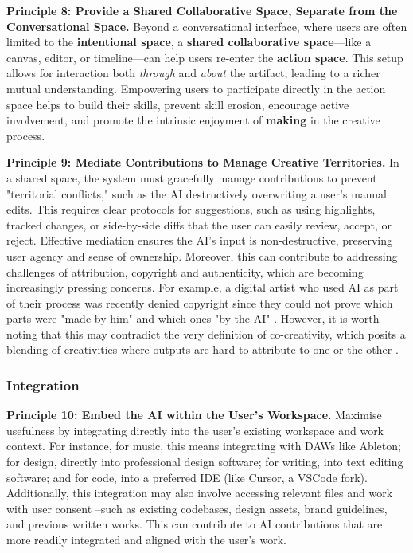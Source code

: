 \textbf{Principle 8: Provide a Shared Collaborative Space, Separate from the Conversational Space.} Beyond a conversational interface, where users are often limited to the \textbf{intentional space}, a \textbf{shared collaborative space}—like a canvas, editor, or timeline—can help users re-enter the \textbf{action space}. This setup allows for interaction both \textit{through} and \textit{about} the artifact, leading to a richer mutual understanding. Empowering users to participate directly in the action space helps to build their skills, prevent skill erosion, encourage active involvement, and promote the intrinsic enjoyment of \textbf{making} in the creative process. 

\textbf{Principle 9: Mediate Contributions to Manage Creative Territories.} In a shared space, the system must gracefully manage contributions to prevent "territorial conflicts," such as the AI destructively overwriting a user's manual edits. This requires clear protocols for suggestions, such as using highlights, tracked changes, or side-by-side diffs that the user can easily review, accept, or reject. Effective mediation ensures the AI's input is non-destructive, preserving user agency and sense of ownership. Moreover, this can contribute to addressing challenges of attribution, copyright and authenticity, which are becoming increasingly pressing concerns. For example, a digital artist who used AI as part of their process was recently denied copyright since they could not prove which parts were "made by him" and which ones "by the AI" \cite{US-Copyright-Office-Review-Board2023-nw}. However, it is worth noting that this may contradict the very definition of co-creativity, which posits a blending of creativities where outputs are hard to attribute to one or the other \cite{Davis2013-jy}. 

\subsubsection{Integration}

\textbf{Principle 10: Embed the AI within the User's Workspace.} Maximise usefulness by integrating directly into the user's existing workspace and work context. For instance, for music, this means integrating with DAWs like Ableton; for design, directly into professional design software; for writing, into text editing software; and for code, into a preferred IDE (like Cursor, a VSCode fork). Additionally, this integration may also involve accessing relevant files and work with user consent --such as existing codebases, design assets, brand guidelines, and previous written works. This can contribute to AI contributions that are more readily integrated and aligned with the user's work. 

